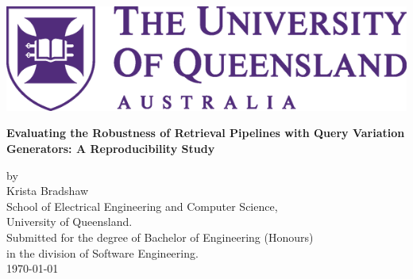 \pagestyle{empty}
\begin{titlepage}
    \renewcommand{\baselinestretch}{1.0}
    \begin{center}
    	\includegraphics[width=.75\textwidth]{UQLogo}
    
        \renewcommand{\baselinestretch}{1.0}
        \vspace*{30mm}
        \Huge
        \textbf{Evaluating the Robustness of Retrieval Pipelines with Query Variation Generators: A Reproducibility Study}
        
        \vspace{30mm}
        \large
            by\\
            Krista Bradshaw\\
            \bigskip\bigskip
            School of Electrical Engineering and Computer Science,\\
            University of Queensland.\\
            \bigskip\bigskip\bigskip\bigskip\bigskip\bigskip
            Submitted for the degree of Bachelor of Engineering (Honours) \\in the division of Software Engineering.\\
            \bigskip\bigskip
            \today		
    \end{center}
\end{titlepage}